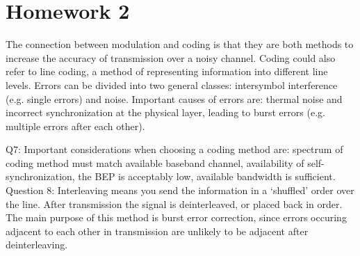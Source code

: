 \documentclass[11pt,titlepage]{report}
\begin{document}
\chapter{Homework 2}
The connection between modulation and coding is that they are both methods to increase the accuracy of transmission over a noisy channel.
Coding could also refer to line coding, a method of representing information into different line levels. 
Errors can be divided into two general classes: intersymbol interference (e.g. single errors) and noise. Important causes of errors are: thermal noise and incorrect synchronization at the physical layer, leading to burst errors (e.g. multiple errors after each other).

Q7:
Important considerations when choosing a coding method are: spectrum of coding method must match available baseband channel, availability of self-synchronization, the BEP is acceptably low, available bandwidth is sufficient.
Question 8:
Interleaving means you send the information in a `shuffled' order over the line. After transmission the signal is deinterleaved, or placed back in order. The main purpose of this method is burst error correction, since errors occuring adjacent to each other in transmission are unlikely to be adjacent after deinterleaving.
\end{document}
